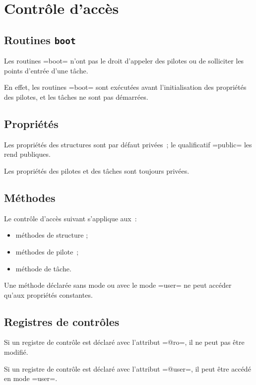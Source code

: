 

\chapter{Contrôle d'accès}



\section{Routines \texttt{boot}}

Les routines \plm=boot= n'ont pas le droit d'appeler des pilotes ou de solliciter les points d'entrée d'une tâche.

En effet, les routines \plm=boot= sont exécutées avant l'initialisation des propriétés des pilotes, et les tâches ne sont pas démarrées.





\section{Propriétés}

Les propriétés des structures sont par défaut privées~; le qualificatif \plm=public= les rend publiques.

Les propriétés des pilotes et des tâches sont toujours privées.







\section{Méthodes}

Le contrôle d'accès suivant s'applique aux~:
\begin{itemize}
  \item méthodes de structure ;
  \item méthodes de pilote~;
  \item méthode de tâche.
\end{itemize}

Une méthode déclarée sans mode ou avec le mode \plm=user= ne peut accéder qu'aux propriétés constantes.


\section{Registres de contrôles}

Si un registre de contrôle est déclaré avec l'attribut \plm=@ro=, il ne peut pas être modifié.

Si un registre de contrôle est déclaré avec l'attribut \plm=@user=, il peut être accédé en mode \plm=user=.

